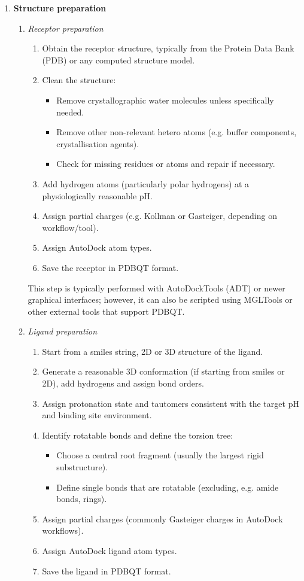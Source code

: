 \documentclass[12pt]{article}
\begin{document}
\begin{enumerate}
  \item \textbf{Structure preparation}
  \begin{enumerate}

    \item \emph{Receptor preparation}
    \begin{enumerate}
  \item Obtain the receptor structure, typically from the Protein Data Bank (PDB) or any computed structure model.
  \item Clean the structure:
  \begin{itemize}
    \item Remove crystallographic water molecules unless specifically needed.
    \item Remove other non-relevant hetero atoms (e.g. buffer components, crystallisation agents).
    \item Check for missing residues or atoms and repair if necessary.
  \end{itemize}
  \item Add hydrogen atoms (particularly polar hydrogens) at a physiologically reasonable pH.
  \item Assign partial charges (e.g. Kollman or Gasteiger, depending on workflow/tool).
  \item Assign AutoDock atom types.
  \item Save the receptor in PDBQT format.
\end{enumerate}

This step is typically performed with AutoDockTools (ADT) or newer graphical interfaces; however, it can also be scripted using MGLTools or other external tools that support PDBQT.

  \item \emph{Ligand preparation}
  \begin{enumerate}
  \item Start from a smiles string, 2D or 3D structure of the ligand.
  \item Generate a reasonable 3D conformation (if starting from smiles or 2D), add hydrogens and assign bond orders.
  \item Assign protonation state and tautomers consistent with the target pH and binding site environment.
  \item Identify rotatable bonds and define the torsion tree:
  \begin{itemize}
    \item Choose a central root fragment (usually the largest rigid substructure).
    \item Define single bonds that are rotatable (excluding, e.g. amide bonds, rings).
  \end{itemize}
  \item Assign partial charges (commonly Gasteiger charges in AutoDock workflows).
  \item Assign AutoDock ligand atom types.
  \item Save the ligand in PDBQT format.
\end{enumerate}
\end{enumerate}


\end{enumerate}
\end{document}
